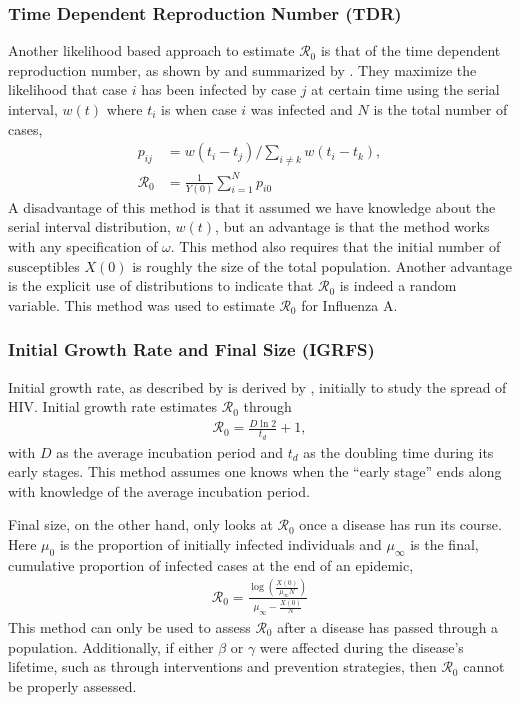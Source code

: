 \documentclass[12pt]{article}
\newcommand{\rr}{\ensuremath{\mathcal{R}_0}}
\begin{document}

\subsubsection{Time Dependent Reproduction Number (TDR)}\label{sec:timedep}
Another likelihood based approach to estimate $\rr$ is that of the time dependent reproduction number, as shown by \cite{wallinga2007generation} and summarized by \cite{obadia2012r0}.  They maximize the likelihood that case $i$ has been infected by case $j$ at certain time using the serial interval, $w(t)$ where $t_i$ is when case $i$ was infected and $N$ is the total number of cases,
\begin{align*}
  p_{ij} &= w(t_i- t_j) / \sum_{i \neq k} w(t_i - t_k),\\
  \rr &= \frac{1}{Y(0)}\sum_{i=1}^N p_{i0}
  \end{align*}
  A disadvantage of this method is that it assumed we have knowledge about the serial interval distribution, $w(t)$, but an advantage is that the method works with any specification of $\omega$.  This method also requires that the initial number of susceptibles $X(0)$ is roughly the size of the total population.  Another advantage is the explicit use of distributions to indicate that $\rr$ is indeed a random variable.  This method was used to estimate $\rr$ for Influenza A.

\subsubsection{Initial Growth Rate and Final Size (IGRFS)}
\label{sec:igr-fs}

Initial growth rate, as described by \cite{dietz1993estimation} is derived by \cite{anderson1986}, initially to study the spread of HIV.  Initial growth rate estimates $\rr$ through
\begin{align*}
\rr = \frac{D \ln 2} {t_d} + 1,
  \end{align*}
  with $D$ as the average incubation period and $t_d$ as the doubling time during its early stages.  This method assumes one knows when the ``early stage'' ends along with knowledge of the average incubation period.  

  Final size, on the other hand, only looks at $\rr$ once a disease has run its course.  Here $\mu_0$ is the proportion of initially infected individuals and $\mu_\infty$ is the final, cumulative proportion of infected cases at the end of an epidemic,
\begin{align}\label{r0_attackrate}
\rr =  \frac{\log \left ( \frac{X(0)}{\mu_{\infty} N}\right )}{\mu_\infty - \frac{X(0)}{N}}
\end{align}
This method can only be used to assess $\rr$ after a disease has passed through a population.  Additionally, if either $\beta$ or $\gamma$ were affected during the disease's lifetime, such as through interventions and prevention strategies, then $\rr$ cannot be properly assessed.
\end{document}
